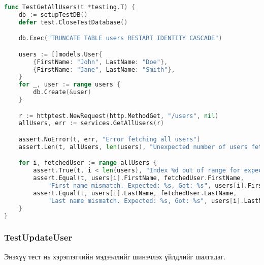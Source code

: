 \begin{lstlisting}[language=Go, caption=Test Get All Users Function, frame=single]
func TestGetAllUsers(t *testing.T) {
    db := setupTestDB()
    defer test.CloseTestDatabase()

    db.Exec("TRUNCATE TABLE users RESTART IDENTITY CASCADE")

    users := []models.User{
        {FirstName: "John", LastName: "Doe"},
        {FirstName: "Jane", LastName: "Smith"},
    }
    for _, user := range users {
        db.Create(&user)
    }

    r := httptest.NewRequest(http.MethodGet, "/users", nil)
    allUsers, err := services.GetAllUsers(r)

    assert.NoError(t, err, "Error fetching all users")
    assert.Len(t, allUsers, len(users), "Unexpected number of users fetched")

    for i, fetchedUser := range allUsers {
        assert.True(t, i < len(users), "Index %d out of range for expected users", i)
        assert.Equal(t, users[i].FirstName, fetchedUser.FirstName, 
            "First name mismatch. Expected: %s, Got: %s", users[i].FirstName, fetchedUser.FirstName)
        assert.Equal(t, users[i].LastName, fetchedUser.LastName, 
            "Last name mismatch. Expected: %s, Got: %s", users[i].LastName, fetchedUser.LastName)
    }
}
\end{lstlisting}

\subsubsection{TestUpdateUser}

Энэхүү тест нь хэрэглэгчийн мэдээллийг шинэчлэх үйлдлийг шалгадаг.

